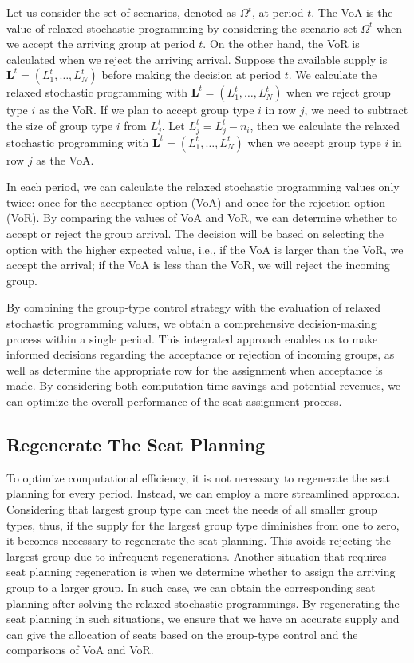 Let us consider the set of scenarios, denoted as $\Omega^{t}$, at period $t$. The VoA is the value of 
relaxed stochastic programming by considering the scenario set $\Omega^{t}$ when we accept the arriving group at period $t$. On the other hand, the VoR is calculated when we reject the arriving arrival. Suppose the available supply is $\mathbf{L}^{t} = (L_1^{t}, \ldots, L_N^{t})$ before making the decision at period $t$. We calculate the relaxed stochastic programming with $\mathbf{L}^{t}= (L_1^{t}, \ldots, L_N^{t})$ when we reject group type $i$ as the VoR. If we plan to accept group type $i$ in row $j$, we need to subtract the size of group type $i$ from $L_j^{t}$. Let $L_j^{t} = L_j^{t} - n_{i}$, then we calculate the relaxed stochastic programming with $\mathbf{L}^{t}= (L_1^{t}, \ldots, L_N^{t})$ when we accept group type $i$ in row $j$ as the VoA.

In each period, we can calculate the relaxed stochastic programming values only twice: once for the acceptance option (VoA) and once for the rejection option (VoR). By comparing the values of VoA and VoR, we can determine whether to accept or reject the group arrival. The decision will be based on selecting the option with the higher expected value, i.e., if the VoA is larger than the VoR, we accept the arrival; if the VoA is less than the VoR, we will reject the incoming group.

By combining the group-type control strategy with the evaluation of relaxed stochastic programming values, we obtain a comprehensive decision-making process within a single period. This integrated approach enables us to make informed decisions regarding the acceptance or rejection of incoming groups, as well as determine the appropriate row for the assignment when acceptance is made. By considering both computation time savings and potential revenues, we can optimize the overall performance of the seat assignment process.

\subsection{Regenerate The Seat Planning}
To optimize computational efficiency, it is not necessary to regenerate the seat planning for every period. Instead, we can employ a more streamlined approach. Considering that largest group type can meet the needs of all smaller group types, thus, if the supply for the largest group type diminishes from one to zero, it becomes necessary to regenerate the seat planning. This avoids rejecting the largest group due to infrequent regenerations. Another situation that requires seat planning regeneration is when we determine whether to assign the arriving group to a larger group. In such case, we can obtain the corresponding seat planning after solving the relaxed stochastic programmings. By regenerating the seat planning in such situations, we ensure that we have an accurate supply and can give the allocation of seats based on the group-type control and the comparisons of VoA and VoR.

